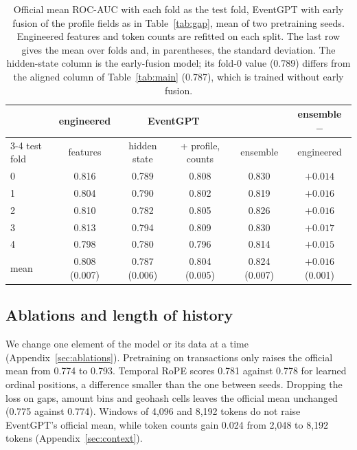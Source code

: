 \documentclass[12pt]{article}
\begin{document}
\begin{table}[htbp]
\centering
\caption{Official mean ROC-AUC with each fold as the test fold, EventGPT with early fusion of the profile fields as in Table~\ref{tab:gap}, mean of two pretraining seeds. Engineered features and token counts are refitted on each split. The last row gives the mean over folds and, in parentheses, the standard deviation. The hidden-state column is the early-fusion model; its fold-0 value (0.789) differs from the aligned column of Table~\ref{tab:main} (0.787), which is trained without early fusion.}
\label{tab:folds}
\small
\setlength{\tabcolsep}{4pt}
\begin{tabular}{lccccc}
\toprule
 & engineered & \multicolumn{2}{c}{EventGPT} & & ensemble $-$ \\
\cmidrule(lr){3-4}
test fold & features & hidden state & + profile, counts & ensemble & engineered \\
\midrule
0 & 0.816 & 0.789 & 0.808 & 0.830 & $+0.014$ \\
1 & 0.804 & 0.790 & 0.802 & 0.819 & $+0.016$ \\
2 & 0.810 & 0.782 & 0.805 & 0.826 & $+0.016$ \\
3 & 0.813 & 0.794 & 0.809 & 0.830 & $+0.017$ \\
4 & 0.798 & 0.780 & 0.796 & 0.814 & $+0.015$ \\
\midrule
mean & 0.808 (0.007) & 0.787 (0.006) & 0.804 (0.005) & 0.824 (0.007) & $+0.016$ (0.001) \\
\bottomrule
\end{tabular}
\end{table}


\subsection{Ablations and length of history}

We change one element of the model or its data at a time (Appendix~\ref{sec:ablations}). Pretraining on transactions only raises the official mean from 0.774 to 0.793. Temporal RoPE scores 0.781 against 0.778 for learned ordinal positions, a difference smaller than the one between seeds. Dropping the loss on gaps, amount bins and geohash cells leaves the official mean unchanged (0.775 against 0.774). Windows of 4,096 and 8,192 tokens do not raise EventGPT's official mean, while token counts gain 0.024 from 2,048 to 8,192 tokens (Appendix~\ref{sec:context}).

\end{document}
